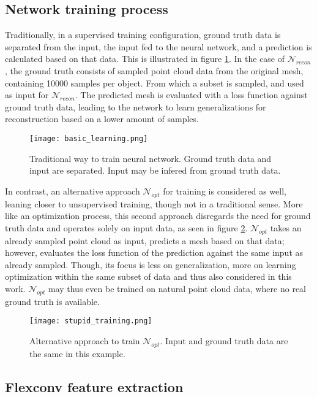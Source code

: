    \subsection{Network training process}
   \label{trainings}
   Traditionally, in a supervised training configuration, ground truth data is separated from the input, the input fed to the neural network,
   and a prediction is calculated based on that data. This is illustrated in figure \ref{fig:training1}. In the case of $\mathcal{N}_{recon}$, the ground
   truth consists of sampled point cloud data from the original mesh, containing 10000 samples per object. From which a subset is sampled, 
   and used as input for $\mathcal{N}_{recon}$. The predicted mesh is evaluated with a loss function against ground truth data, leading to 
   the network to learn generalizations for reconstruction based on a lower amount of samples.

   \begin{figure}
      \centering
      \texttt{[image: basic\_learning.png]}
      \caption{Traditional way to train neural network. Ground truth data and input are separated. Input may be infered from ground truth data.} \label{fig:training1}
    \end{figure}

   In contrast, an alternative approach $\mathcal{N}_{opt}$ for training is considered as well, leaning closer to unsupervised training, though not in a traditional sense.
   More like an optimization process, this second approach disregards the need for ground truth data and operates solely on input data, as seen in
   figure \ref{fig:training2}. $\mathcal{N}_{opt}$ takes an already sampled point cloud as input, predicts a mesh based on that data; however, evaluates the 
   loss function of the prediction against the same input as already sampled.
   Though, its focus is less on generalization, more on learning optimization within the same subset of data and thus also considered in this work.
   $\mathcal{N}_{opt}$ may thus even be trained on natural point cloud data, where no real ground truth is available.

   \begin{figure}[htbp]
   \centering
   \texttt{[image: stupid\_training.png]}
   \caption{Alternative approach to train $\mathcal{N}_{opt}$. Input and ground truth data are the same in this example.} \label{fig:training2}
   \end{figure}

\subsection{Flexconv feature extraction}
\label{fconv}

